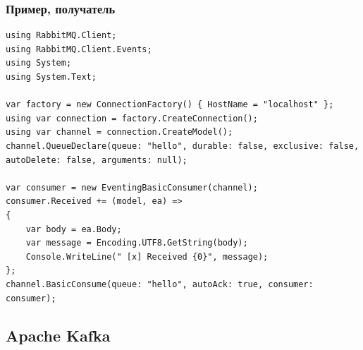 \documentclass{../../slides-style}
\begin{document}
    \begin{frame}[fragile]
        \frametitle{Пример, получатель}
        \begin{ssmall}
            \begin{verbatim}
using RabbitMQ.Client;
using RabbitMQ.Client.Events;
using System;
using System.Text;

var factory = new ConnectionFactory() { HostName = "localhost" };
using var connection = factory.CreateConnection();
using var channel = connection.CreateModel();
channel.QueueDeclare(queue: "hello", durable: false, exclusive: false, autoDelete: false, arguments: null);

var consumer = new EventingBasicConsumer(channel);
consumer.Received += (model, ea) =>
{
    var body = ea.Body;
    var message = Encoding.UTF8.GetString(body);
    Console.WriteLine(" [x] Received {0}", message);
};
channel.BasicConsume(queue: "hello", autoAck: true, consumer: consumer);
            \end{verbatim}
        \end{ssmall}
    \end{frame}

    \subsection{Apache Kafka}
\end{document}
